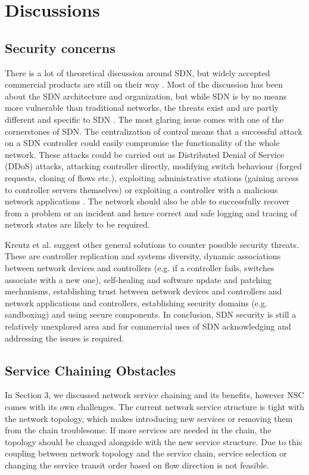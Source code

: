\section{Discussions}

\subsection{Security concerns}

There is a lot of theoretical discussion around SDN, but widely accepted commercial products are still on their way \cite{Sorensen12}. Most of the discussion has been about the SDN architecture and organization, but while SDN is by no means more vulnerable than traditional networks, the threats exist and are partly different and specific to SDN \cite{Kreutz13}. The most glaring issue comes with one of the cornerstones of SDN. The centralization of control means that a successful attack on a SDN controller could easily compromise the functionality of the whole network. These attacks could be carried out as Distributed Denial of Service (DDoS) attacks, attacking controller directly, modifying switch behaviour (forged requests, cloning of flows etc.), exploiting administrative stations (gaining access to controller servers themselves) or exploiting a controller with a malicious network applications \cite{Kreutz13}. The network should also be able to successfully recover from a problem or an incident and hence correct and safe logging and tracing of network states are likely to be required.

Kreutz et al. suggest other general solutions to counter possible security threats. These are controller replication and systems diversity, dynamic associations between network devices and controllers (e.g. if a controller fails, switches associate with a new one), self-healing and software update and patching mechanisms, establishing trust between network devices and controllers and network applications and controllers, establishing security domains (e.g. sandboxing) and using secure components. In conclusion, SDN security is still a relatively unexplored area and for commercial uses of SDN acknowledging and addressing the issues is required.

\subsection{Service Chaining Obstacles}

In Section 3, we discussed network service chaining and its benefits, however NSC comes with its own challenges. The current network service structure is tight with the network topology, which makes introducing new services or removing them from the chain troublesome. If more services are needed in the chain, the topology should be changed alongside with the new service structure. Due to this coupling between network topology and the service chain, service selection or changing the service transit order based on flow direction is not feasible. \cite{QN14}

